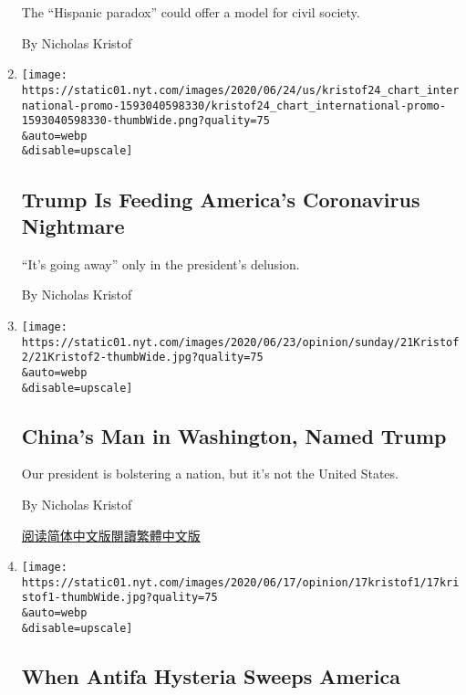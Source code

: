 \begin{enumerate}
  The ``Hispanic paradox'' could offer a model for civil society.

  By Nicholas Kristof
\item
  \href{/2020/06/24/opinion/trump-coronavirus.html}{}

  \texttt{[image: https://static01.nyt.com/images/2020/06/24/us/kristof24\_chart\_international-promo-1593040598330/kristof24\_chart\_international-promo-1593040598330-thumbWide.png?quality=75\\\&auto=webp\\\&disable=upscale]}

  \hypertarget{trump-is-feeding-americas-coronavirus-nightmare}{%
  \subsection{Trump Is Feeding America's Coronavirus
  Nightmare}\label{trump-is-feeding-americas-coronavirus-nightmare}}

  ``It's going away'' only in the president's delusion.

  By Nicholas Kristof
\item
  \href{/2020/06/20/opinion/sunday/trump-china-john-bolton-book.html}{}

  \texttt{[image: https://static01.nyt.com/images/2020/06/23/opinion/sunday/21Kristof2/21Kristof2-thumbWide.jpg?quality=75\\\&auto=webp\\\&disable=upscale]}

  \hypertarget{chinas-man-in-washington-named-trump}{%
  \subsection{China's Man in Washington, Named
  Trump}\label{chinas-man-in-washington-named-trump}}

  Our president is bolstering a nation, but it's not the United States.

  By Nicholas Kristof

  \href{https://cn.nytimes.com/opinion/20200623/trump-china-john-bolton-book/}{阅读简体中文版}\href{https://cn.nytimes.com/opinion/20200623/trump-china-john-bolton-book/zh-hant/}{閱讀繁體中文版}
\item
  \href{/2020/06/17/opinion/antifa-protests.html}{}

  \texttt{[image: https://static01.nyt.com/images/2020/06/17/opinion/17kristof1/17kristof1-thumbWide.jpg?quality=75\\\&auto=webp\\\&disable=upscale]}

  \hypertarget{when-antifa-hysteria-sweeps-america}{%
  \subsection{When Antifa Hysteria Sweeps
  America}\label{when-antifa-hysteria-sweeps-america}}


\end{enumerate}

